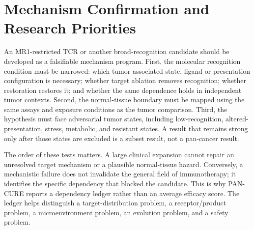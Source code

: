 \documentclass[10pt,conference]{IEEEtran}
\begin{document}
\section{Mechanism Confirmation and Research Priorities}\label{sec:priorities}
An MR1-restricted TCR or another broad-recognition candidate should be developed as a falsifiable mechanism program. First, the molecular recognition condition must be narrowed: which tumor-associated state, ligand or presentation configuration is necessary; whether target ablation removes recognition; whether restoration restores it; and whether the same dependence holds in independent tumor contexts. Second, the normal-tissue boundary must be mapped using the same assays and exposure conditions as the tumor comparison. Third, the hypothesis must face adversarial tumor states, including low-recognition, altered-presentation, stress, metabolic, and resistant states. A result that remains strong only after those states are excluded is a subset result, not a pan-cancer result.

The order of these tests matters. A large clinical expansion cannot repair an unresolved target mechanism or a plausible normal-tissue hazard. Conversely, a mechanistic failure does not invalidate the general field of immunotherapy; it identifies the specific dependency that blocked the candidate. This is why PAN-CURE reports a dependency ledger rather than an average efficacy score. The ledger helps distinguish a target-distribution problem, a receptor/product problem, a microenvironment problem, an evolution problem, and a safety problem.
\end{document}
